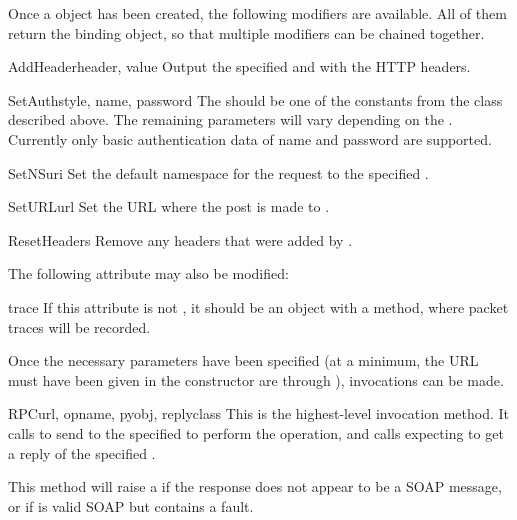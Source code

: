 Once a  object has been created, the following modifiers are
available.
All of them return the binding object, so that multiple modifiers can
be chained together.

\begin{methoddesc}{AddHeader}{header, value}
Output the specified  and  with the HTTP
headers.
\end{methoddesc}

\begin{methoddesc}{SetAuth}{style, name, password}
The  should be one of the constants from the 
class described above.
The remaining parameters will vary depending on the .
Currently only basic authentication data of name and password are
supported.
\end{methoddesc}

\begin{methoddesc}{SetNS}{uri}
Set the default namespace for the request to the specified .
\end{methoddesc}

\begin{methoddesc}{SetURL}{url}
Set the URL where the post is made to .
\end{methoddesc}

\begin{methoddesc}{ResetHeaders}{}
Remove any headers that were added by .
\end{methoddesc}

The following attribute may also be modified:

\begin{memberdesc}{trace}
If this attribute is not , it should be an object with a
 method, where packet traces will be recorded.
\end{memberdesc}

Once the necessary parameters have been specified (at a minimum, the URL
must have been given in the constructor are through ),
invocations can be made.

\begin{methoddesc}{RPC}{url, opname, pyobj, replyclass}
This is the highest-level invocation method.
It calls  to send  to the specified 
to perform the  operation,
and calls  expecting to get a reply of the specified
.

This method will raise a  if the response does not
appear to be a SOAP message, or if is valid SOAP but contains a fault.
\end{methoddesc}

